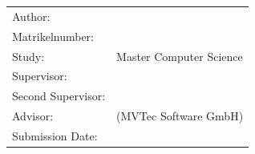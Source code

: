 \begin{titlepage}
  \centering
  

  \vspace{15mm}
  {\huge\MakeUppercase{\getFaculty{}}}\\

  \vspace{5mm}
  {\large\MakeUppercase{\getUniversity{}}}\\

  \vspace{20mm}
  {\Large \getDoctype{}}

  \vspace{15mm}
  {\huge\bfseries \getTitle{} \par}

  \vspace{10mm}
  {\huge\bfseries \foreignlanguage{ngerman}{\getTitleGer{}} \par}

  \vspace{15mm}
  \begin{tabular}{l l}
    Author:          	& \getAuthor{} \\
    Matrikelnumber:	 	& \getMatrikelNum{} \\
    Study:			 	& Master Computer Science \\
    Supervisor:      	& \getSupervisor{}  \\
    Second Supervisor:	& \getSecondSupervisor{} \\
    Advisor:         	& \getAdvisor{} (MVTec Software GmbH)\\
    Submission Date: 	& \getSubmissionDate{} \\
  \end{tabular}

 
\end{titlepage}
